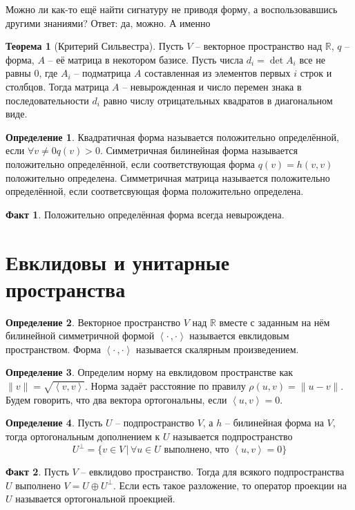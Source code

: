 \documentclass[10pt,a4paper,oneside]{book}
\theoremstyle{definition}
\newtheorem{defn}{Определение}
\newtheorem*{fact}{Факт}
\newtheorem{thm}{Теорема}
\newcommand{\mb}[1]{\mathbb{#1}}
\def\lan{\left\langle }
\def\ran{\right\rangle}
\def\thrm{\begin{thm}}
\def\ethrm{\end{thm}}
\def\dfn{\begin{defn}}
\def\edfn{\end{defn}}
\def\fct{\begin{fact}}
\def\efct{\end{fact}}
\begin{document}
Можно ли как-то ещё найти сигнатуру не приводя форму, а воспользовавшись другими знаниями? Ответ: да, можно. А именно

\thrm[Критерий Сильвестра]
Пусть $V$ -- векторное пространство над $\mb R$, $q$ -- форма, $A$ -- её матрица в некотором базисе. Пусть числа $d_i=\det A_i$ все не равны $0$, где $A_i$ -- подматрица $A$ составленная из элементов первых $i$ строк и столбцов. Тогда матрица $A$ -- невырожденная и число перемен знака в последовательности $d_i$ равно числу отрицательных квадратов в диагональном виде.
\ethrm

\dfn Квадратичная форма называется положительно определённой, если $\forall v\neq 0 q(v)>0$. Симметричная билинейная форма называется положительно определённой, если соответствующая форма $q(v)=h(v,v)$ положительно определена. Симметричная матрица называется положительно определённой, если соответсвующая форма положительно определена.
\edfn

\fct Положительно определённая форма всегда невырождена.
\efct










\section{Евклидовы и унитарные пространства}


\dfn Векторное пространство $V$ над $\mb R$ вместе с заданным на нём билинейной симметричной формой $\lan\cdot \, , \cdot \ran$ называется евклидовым пространством. Форма $\lan\cdot \, , \cdot \ran$ называется скалярным произведением. 
\edfn

\dfn Определим  норму на евклидовом пространстве как $\|v\|=\sqrt{\lan v , v\ran }$. Норма задаёт расстояние по правилу $\rho(u,v)=\|u-v\|$. Будем говорить, что два вектора ортогональны, если $\lan u,v \ran =0$.
\edfn

\dfn Пусть $U$ -- подпространство $V$, а $h$ -- билинейная форма на $V$, тогда ортогональным дополнением к $U$ называется подпространство 
$$U^{\bot}=\{ v\in V\,|\, \forall u \in U \text{ выполнено, что } \lan u, v \ran =0\}$$
\edfn
 
\fct Пусть $V$ -- евклидово пространство. Тогда для всякого подпространства $U$ выполнено $V=U\oplus U^{\bot}$. Если есть такое разложение, то оператор проекции на $U$ называется ортогональной проекцией.
\efct
\end{document}
